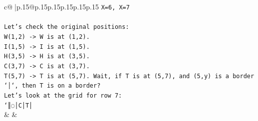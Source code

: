 \documentclass{article}
\begin{document}
{\begin{supertabular}{c@{$\;$}|p{.15\linewidth}@{}p{.15\linewidth}p{.15\linewidth}p{.15\linewidth}p{.15\linewidth}p{.15\linewidth}}
{{{\texttt{X=6, X=7} \\
\\ 
\texttt{Let's check the original positions:} \\
\texttt{W(1,2) {-}> W is at (1,2).} \\
\texttt{I(1,5) {-}> I is at (1,5).} \\
\texttt{H(3,5) {-}> H is at (3,5).} \\
\texttt{C(3,7) {-}> C is at (3,7).} \\
\texttt{T(5,7) {-}> T is at (5,7). Wait, if T is at (5,7), and (5,y) is a border `│`, then T is on a border?} \\
\texttt{Let's look at the grid for row 7:} \\
\texttt{`║◌│C│T│} \\
            }
        }
    }
    & & \\ \\


\end{supertabular}}
\end{document}

